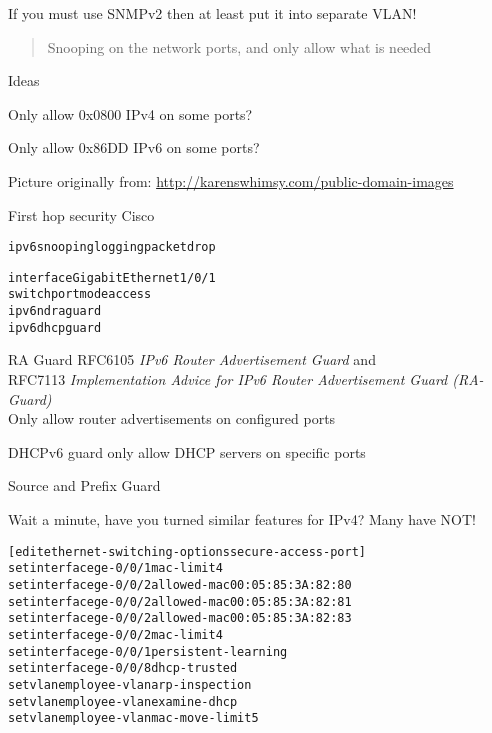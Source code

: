 \documentclass[Screen16to9,17pt]{foils}
\newcommand{\myalert}{\color{red}\faFlag}
\begin{document}
If you must use SNMPv2 then at least put it into separate VLAN! {\myalert}



\begin{quote}
Snooping on the network ports, and only allow what is needed
\end{quote}

Ideas
\begin{list2}
\item Only allow 0x0800 IPv4 on some ports?
\item Only allow 0x86DD IPv6 on some ports?
\end{list2}



\centerline{Picture originally from: \url{http://karenswhimsy.com/public-domain-images}}




First hop security Cisco
\begin{alltt}\small
ipv6 snooping logging packet drop

interface GigabitEthernet1/0/1
    switchport mode access
    ipv6 nd raguard
    ipv6 dhcp guard
\end{alltt}

\begin{list2}
\item RA Guard RFC6105 \emph{IPv6 Router Advertisement Guard} and \\
RFC7113 \emph{Implementation Advice for IPv6 Router Advertisement Guard (RA-Guard)}\\
Only allow router advertisements on configured ports
\item DHCPv6 guard only allow DHCP servers on specific ports
\item Source and Prefix Guard
\end{list2}

Wait a minute, have you turned similar features for IPv4? Many have NOT! {\myalert}


\begin{alltt}\small
[edit ethernet-switching-options secure-access-port]
set interface ge-0/0/1 mac-limit 4
set interface ge-0/0/2 allowed-mac 00:05:85:3A:82:80
set interface ge-0/0/2 allowed-mac 00:05:85:3A:82:81
set interface ge-0/0/2 allowed-mac 00:05:85:3A:82:83
set interface ge-0/0/2 mac-limit 4
set interface ge-0/0/1 persistent-learning
set interface ge-0/0/8 dhcp-trusted
set vlan employee-vlan arp-inspection
set vlan employee-vlan examine-dhcp
set vlan employee-vlan mac-move-limit 5
\end{alltt}
\end{document}
